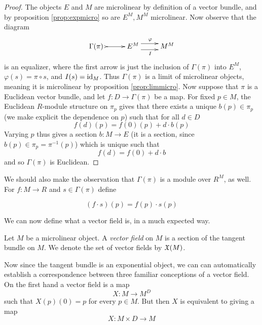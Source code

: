 \begin{proof}
  The objects \( E \) and \( M \) are microlinear by definition of a vector bundle, and by proposition \ref{prop:expmicro} so are \( E^M, M^M \) microlinear. Now observe that the diagram
  \begin{equation*}
    \xymatrix{
      {\Gamma(\pi)\,\,} \ar@{>->}[r] & E^M \ar@<1ex>[r]^{\varphi} \ar@<-1ex>[r]_{I} & M^M 
    }
  \end{equation*}
  is an equalizer, where the first arrow is just the inclusion of \( \Gamma(\pi) \) into \( E^M \), \( \varphi(s) = \pi\circ s \), and \( I(s) = \operatorname{id}_M \). Thus \( \Gamma(\pi) \) is a limit of microlinear objects, meaning it is microlinear by proposition \ref{prop:limmicro}. Now suppose that \( \pi \) is a Euclidean vector bundle, and let \( f:D\to \Gamma(\pi) \) be a map. For fixed \( p\in M \), the Euclidean \( R \)-module structure on \( \pi_p \) gives that there exists a unique \( b(p)\in \pi_p \) (we make explicit the dependence on \( p \)) such that for all \( d\in D \)
  \begin{equation*}
    f(d)(p) = f(0)(p) + d\cdot b(p)
  \end{equation*}
  Varying \( p \) thus gives a section \( b:M\to E \) (it is a section, since \( b(p)\in \pi_p = \pi^{-1}(p) \)) which is unique such that
  \begin{equation*}
    f(d) = f(0) + d\cdot b
  \end{equation*}
  and so \( \Gamma(\pi) \) is Euclidean.
\end{proof}

We should also make the observation that \( \Gamma(\pi) \) is a module over \( R^M \), as well. For \( f:M\to R \) and \( s\in \Gamma(\pi) \) define

\begin{equation*}
  (f\cdot s)(p)=f(p)\cdot s(p)
\end{equation*}

We can now define what a vector field is, in a much expected way.

\begin{defn}
  Let \( M \) be a microlinear object. A \emph{vector field} on \( M \) is a section of the tangent bundle on \( M \). We denote the set of vector fields by \( \mathfrak X(M) \).
\end{defn}

Now since the tangent bundle is an exponential object, we can can automatically establish a correspondence between three familiar conceptions of a vector field. On the first hand a vector field is a map
\begin{equation*}
  X:M\to M^D
\end{equation*}
such that \( X(p)(0)=p \) for every \( p\in M \). But then \( X \) is equivalent to giving a map
\begin{equation*}
  X:M\times D \to M
\end{equation*}

